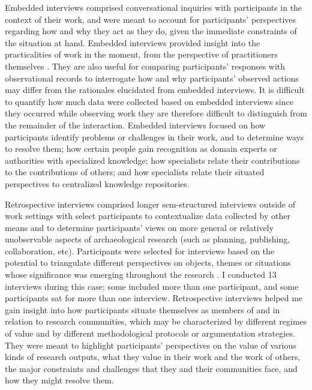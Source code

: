 \documentclass{article}
\begin{document}
Embedded interviews comprised conversational inquiries with participants
in the context of their work, and were meant to account for
participants' perspectives regarding how and why they act as they do,
given the immediate constraints of the situation at hand. Embedded
interviews provided insight into the practicalities of work in the
moment, from the perspective of practitioners themselves
\parencites{flick1997}{flick2000}{witzel2000}. They are also useful for
comparing participants' responses with observational records to
interrogate how and why participants' observed actions may differ from
the rationales elucidated from embedded interviews. It is difficult to
quantify how much data were collected based on embedded interviews since
they occurred while observing work they are therefore difficult to
distinguish from the remainder of the interaction. Embedded interviews
focused on how participants identify problems or challenges in their
work, and to determine ways to resolve them; how certain people gain
recognition as domain experts or authorities with specialized knowledge;
how specialists relate their contributions to the contributions of
others; and how specialists relate their situated perspectives to
centralized knowledge repositories.

Retrospective interviews comprised longer sem-structured interviews
outside of work settings with select participants to contextualize data
collected by other means and to determine participants' views on more
general or relatively unobservable aspects of archaeological research
(such as planning, publishing, collaboration, etc). Participants were
selected for interviews based on the potential to triangulate different
perspectives on objects, themes or situations whose significance was
emerging throughout the research \parencite{morse2019}. I conducted 13
interviews during this case; some included more than one participant,
and some participants sat for more than one interview. Retrospective
interviews helped me gain insight into how participants situate
themselves as members of and in relation to research communities, which
may be characterized by different regimes of value and by different
methodological protocols or argumentation strategies. They were meant to
highlight participants' perspectives on the value of various kinds of
research outputs, what they value in their work and the work of others,
the major constraints and challenges that they and their communities
face, and how they might resolve them.
\end{document}
